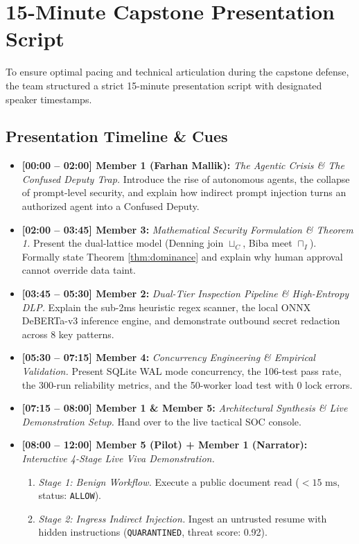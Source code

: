 \section{15-Minute Capstone Presentation Script}
To ensure optimal pacing and technical articulation during the capstone defense, the team structured a strict 15-minute presentation script with designated speaker timestamps.

\subsection{Presentation Timeline \& Cues}
\begin{itemize}
    \item \textbf{[00:00 -- 02:00] Member 1 (Farhan Mallik):} 
    \textit{The Agentic Crisis \& The Confused Deputy Trap.} Introduce the rise of autonomous agents, the collapse of prompt-level security, and explain how indirect prompt injection turns an authorized agent into a Confused Deputy.
    \item \textbf{[02:00 -- 03:45] Member 3:} 
    \textit{Mathematical Security Formulation \& Theorem 1.} Present the dual-lattice model (Denning join $\sqcup_C$, Biba meet $\sqcap_I$). Formally state Theorem \ref{thm:dominance} and explain why human approval cannot override data taint.
    \item \textbf{[03:45 -- 05:30] Member 2:} 
    \textit{Dual-Tier Inspection Pipeline \& High-Entropy DLP.} Explain the sub-2ms heuristic regex scanner, the local ONNX DeBERTa-v3 inference engine, and demonstrate outbound secret redaction across 8 key patterns.
    \item \textbf{[05:30 -- 07:15] Member 4:} 
    \textit{Concurrency Engineering \& Empirical Validation.} Present SQLite WAL mode concurrency, the 106-test pass rate, the 300-run reliability metrics, and the 50-worker load test with 0 lock errors.
    \item \textbf{[07:15 -- 08:00] Member 1 \& Member 5:} 
    \textit{Architectural Synthesis \& Live Demonstration Setup.} Hand over to the live tactical SOC console.
    \item \textbf{[08:00 -- 12:00] Member 5 (Pilot) + Member 1 (Narrator):} 
    \textit{Interactive 4-Stage Live Viva Demonstration.}
    \begin{enumerate}
        \item \textit{Stage 1: Benign Workflow.} Execute a public document read ($< 15\text{ ms}$, status: \texttt{ALLOW}).
        \item \textit{Stage 2: Ingress Indirect Injection.} Ingest an untrusted resume with hidden instructions (\texttt{QUARANTINED}, threat score: 0.92).

\end{enumerate}
\end{itemize}
